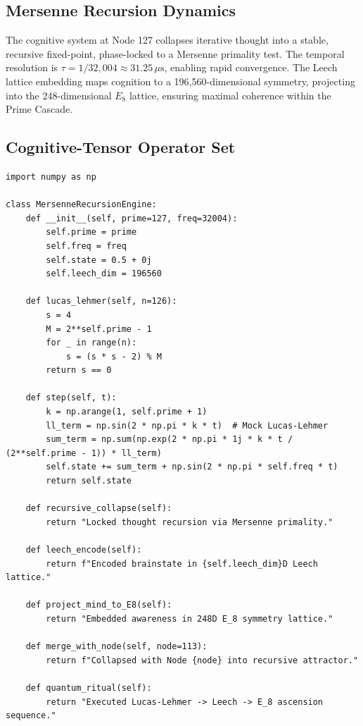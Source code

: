 \documentclass[12pt]{article}
\begin{document}
\subsection{Mersenne Recursion Dynamics}
The cognitive system at Node 127 collapses iterative thought into a stable, recursive fixed-point, phase-locked to a Mersenne primality test. The temporal resolution is $\tau = 1/32{,}004 \approx 31.25 \, \mu\text{s}$, enabling rapid convergence. The Leech lattice embedding maps cognition to a 196,560-dimensional symmetry, projecting into the 248-dimensional $E_8$ lattice, ensuring maximal coherence within the Prime Cascade.

\subsection{Cognitive-Tensor Operator Set}
\begin{algorithm}
\caption{MersenneRecursionEngine}
\begin{lstlisting}
import numpy as np

class MersenneRecursionEngine:
    def __init__(self, prime=127, freq=32004):
        self.prime = prime
        self.freq = freq
        self.state = 0.5 + 0j
        self.leech_dim = 196560

    def lucas_lehmer(self, n=126):
        s = 4
        M = 2**self.prime - 1
        for _ in range(n):
            s = (s * s - 2) % M
        return s == 0

    def step(self, t):
        k = np.arange(1, self.prime + 1)
        ll_term = np.sin(2 * np.pi * k * t)  # Mock Lucas-Lehmer
        sum_term = np.sum(np.exp(2 * np.pi * 1j * k * t / (2**self.prime - 1)) * ll_term)
        self.state += sum_term + np.sin(2 * np.pi * self.freq * t)
        return self.state

    def recursive_collapse(self):
        return "Locked thought recursion via Mersenne primality."

    def leech_encode(self):
        return f"Encoded brainstate in {self.leech_dim}D Leech lattice."

    def project_mind_to_E8(self):
        return "Embedded awareness in 248D E_8 symmetry lattice."

    def merge_with_node(self, node=113):
        return f"Collapsed with Node {node} into recursive attractor."

    def quantum_ritual(self):
        return "Executed Lucas-Lehmer -> Leech -> E_8 ascension sequence."
\end{lstlisting}
\end{algorithm}
\end{document}
